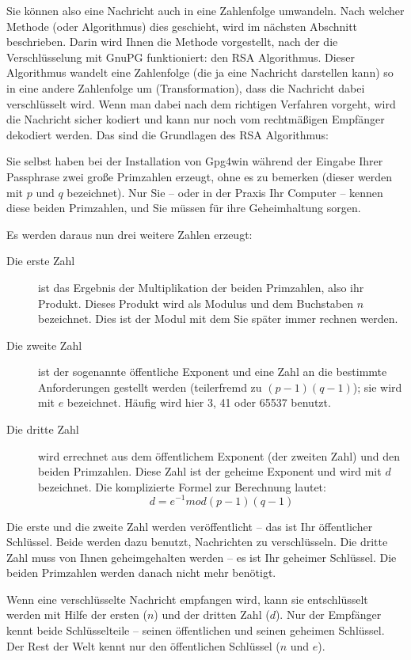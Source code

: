 \documentclass[a4paper,11pt, oneside,openright,titlepage,dvips]{scrbook}
\newcommand{\bmod}{mod}
\begin{document}
Sie können also eine Nachricht auch in eine Zahlenfolge umwandeln.
Nach welcher Methode (oder Algorithmus) dies geschieht, wird im
nächsten Abschnitt beschrieben. Darin wird Ihnen die Methode
vorgestellt, nach der die Verschlüsselung mit GnuPG funktioniert: den
RSA Algorithmus. Dieser Algorithmus wandelt eine Zahlenfolge (die ja
eine Nachricht darstellen kann) so in eine andere Zahlenfolge um
(Transformation), dass die Nachricht dabei verschlüsselt wird. Wenn
man dabei nach dem richtigen Verfahren vorgeht, wird die Nachricht
sicher kodiert und kann nur noch vom rechtmäßigen Empfänger dekodiert
werden.  Das sind die Grundlagen des RSA Algorithmus:

Sie selbst haben bei der Installation von Gpg4win während der Eingabe
Ihrer Passphrase zwei große Primzahlen erzeugt, ohne es zu
bemerken (dieser werden mit $p$ und $q$ bezeichnet). Nur Sie --­ oder
in der Praxis Ihr Computer --­ kennen diese beiden Primzahlen, und Sie
müssen für ihre Geheimhaltung sorgen.

Es werden daraus nun drei weitere Zahlen erzeugt:
\begin{description}
\item [Die erste Zahl] ist das Ergebnis der Multiplikation der beiden
  Primzahlen, also ihr Produkt.  Dieses Produkt wird als Modulus und
  dem Buchstaben $n$ bezeichnet.  Dies ist der Modul mit dem Sie
  später immer rechnen werden.

\item [Die zweite Zahl] ist der sogenannte öffentliche Exponent und
  eine Zahl an die bestimmte Anforderungen gestellt werden
  (teilerfremd zu $(p-1)(q-1)$); sie wird mit $e$ bezeichnet. Häufig
  wird hier 3, 41 oder 65537 benutzt.

\item [Die dritte Zahl] wird errechnet aus dem öffentlichem Exponent
  (der zweiten Zahl) und den beiden Primzahlen. Diese Zahl ist der
  geheime Exponent und wird mit $d$ bezeichnet.  Die komplizierte
  Formel zur Berechnung lautet:
      \[ d = e^{-1} \bmod (p - 1)(q -1) \]
\end{description}


Die erste und die zweite Zahl werden veröffentlicht ­-- das ist Ihr
öffentlicher Schlüssel.  Beide werden dazu benutzt, Nachrichten zu
verschlüsseln. Die dritte Zahl muss von Ihnen geheimgehalten werden
­-- es ist Ihr geheimer Schlüssel.  Die beiden Primzahlen werden
danach nicht mehr benötigt.

Wenn eine verschlüsselte Nachricht empfangen wird, kann sie
entschlüsselt werden mit Hilfe der ersten ($n$) und der dritten Zahl
($d$).  Nur der Empfänger kennt beide Schlüsselteile ­-- seinen
öffentlichen und seinen geheimen Schlüssel. Der Rest der Welt kennt
nur den öffentlichen Schlüssel ($n$ und $e$).
\end{document}
